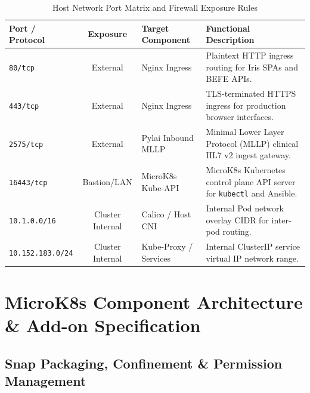 \begin{table}[htbp]
\centering
\small
\begin{tabularx}{\textwidth}{l c l X}
\toprule
\textbf{Port / Protocol} & \textbf{Exposure} & \textbf{Target Component} & \textbf{Functional Description} \\
\midrule
\texttt{80/tcp} & External & Nginx Ingress & Plaintext HTTP ingress routing for Iris SPAs and BEFE APIs. \\
\texttt{443/tcp} & External & Nginx Ingress & TLS-terminated HTTPS ingress for production browser interfaces. \\
\texttt{2575/tcp} & External & Pylai Inbound MLLP & Minimal Lower Layer Protocol (MLLP) clinical HL7 v2 ingest gateway. \\
\texttt{16443/tcp} & Bastion/LAN & MicroK8s Kube-API & MicroK8s Kubernetes control plane API server for \texttt{kubectl} and Ansible. \\
\addlinespace
\texttt{10.1.0.0/16} & Cluster Internal & Calico / Host CNI & Internal Pod network overlay CIDR for inter-pod routing. \\
\texttt{10.152.183.0/24} & Cluster Internal & Kube-Proxy / Services & Internal ClusterIP service virtual IP network range. \\
\bottomrule
\end{tabularx}
\caption{Host Network Port Matrix and Firewall Exposure Rules}
\label{tab:firewall_ports}
\end{table}

\section{MicroK8s Component Architecture \& Add-on Specification}
\label{sec:microk8s_addons}

\subsection{Snap Packaging, Confinement \& Permission Management}

